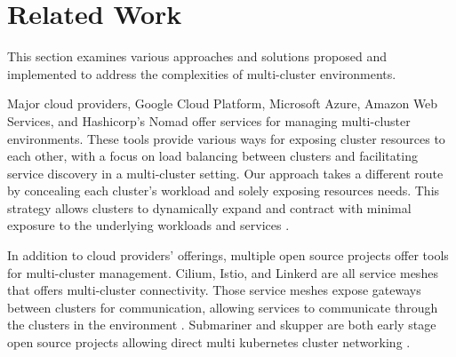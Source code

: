 
\chapter{Related Work}

%
%
%
%
%
%
%
%
%
%
%
%
This section examines various approaches and solutions proposed and implemented
to address the complexities of multi-cluster environments.

Major cloud providers, Google Cloud Platform, Microsoft Azure, Amazon Web
Services, and Hashicorp's Nomad offer services for managing multi-cluster
environments. These tools provide various ways for exposing cluster resources
to each other, with a focus on load balancing between clusters and facilitating
service discovery in a multi-cluster setting. Our approach takes a different
route by concealing each cluster's workload and solely exposing resources
needs. This strategy allows clusters to dynamically expand and contract with
minimal exposure to the underlying workloads and services
\cite{noauthor_fleet_nodate, noauthor_azure_nodate,
noauthor_multi-region_nodate}.

In addition to cloud providers' offerings, multiple open source projects offer
tools for multi-cluster management. Cilium, Istio, and Linkerd are all service
meshes that offers multi-cluster connectivity. Those service meshes expose
gateways between clusters for communication, allowing services to communicate
through the clusters in the environment \cite{noauthor_cluster_nodate,
noauthor_multi-cluster_nodate-2, noauthor_install_nodate}. Submariner and
skupper are both early stage open source projects allowing direct multi
kubernetes cluster networking \cite{noauthor__nodate, noauthor_skupper_nodate}. 

